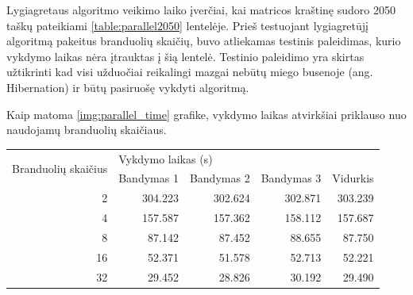 \documentclass{VUMIFPSbakalaurinis}
\begin{document}
Lygiagretaus algoritmo veikimo laiko įverčiai, kai matricos kraštinę sudoro 2050 taškų pateikiami \ref{table:parallel2050} lentelėje. 
Prieš testuojant lygiagretūjį algoritmą pakeitus branduolių skaičių, buvo atliekamas testinis paleidimas, kurio vykdymo laikas nėra įtrauktas į šią lentelė. 
Testinio paleidimo yra skirtas užtikrinti kad visi užduočiai reikalingi mazgai nebūtų miego busenoje (ang. Hibernation) ir būtų pasiruošę vykdyti algoritmą.

Kaip matoma \ref{img:parallel_time} grafike, vykdymo laikas atvirkšiai priklauso nuo naudojamų branduolių skaičiaus.

\begin{table}[H]
    \begin{tabular}{|r|rrrr|}
        \hline
        \multicolumn{1}{|l|}{\multirow{2}{*}{Branduolių skaičius}} & \multicolumn{4}{l|}{Vykdymo laikas (s)}                                                                                                     \\ \cline{2-5}
        \multicolumn{1}{|l|}{}                                     & \multicolumn{1}{l|}{Bandymas 1}         & \multicolumn{1}{l|}{Bandymas 2} & \multicolumn{1}{l|}{Bandymas 3} & \multicolumn{1}{l|}{Vidurkis} \\ \hline
        2                                                          & \multicolumn{1}{r|}{304.223}            & \multicolumn{1}{r|}{302.624}    & \multicolumn{1}{r|}{302.871}    & 303.239                       \\ \hline
        4                                                          & \multicolumn{1}{r|}{157.587}            & \multicolumn{1}{r|}{157.362}    & \multicolumn{1}{r|}{158.112}    & 157.687                       \\ \hline
        8                                                          & \multicolumn{1}{r|}{87.142}             & \multicolumn{1}{r|}{87.452}     & \multicolumn{1}{r|}{88.655}     & 87.750                        \\ \hline
        16                                                         & \multicolumn{1}{r|}{52.371}             & \multicolumn{1}{r|}{51.578}     & \multicolumn{1}{r|}{52.713}     & 52.221                        \\ \hline
        32                                                         & \multicolumn{1}{r|}{29.452}             & \multicolumn{1}{r|}{28.826}     & \multicolumn{1}{r|}{30.192}     & 29.490                        \\ \hline

\end{tabular}
\end{table}
\end{document}
